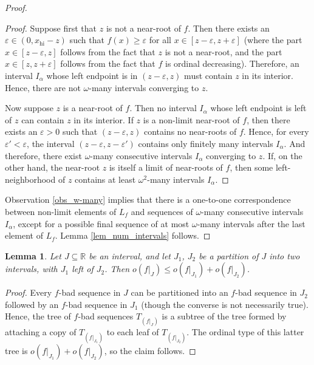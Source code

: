 \documentclass{article}
\newtheorem{Lemma}[Theorem]{Lemma}
\theoremstyle{definition}
\begin{document}
\begin{proof}
\begin{proof}
Suppose first that $z$ is not a near-root of $f$. Then there exists an $\varepsilon\in(0,x_{\mathrm{hi}}-z)$ such that $f(x)\ge\varepsilon$ for all $x\in [z-\varepsilon,z+\varepsilon]$ (where the part $x\in[z-\varepsilon, z]$ follows from the fact that $z$ is not a near-root, and the part $x\in[z, z+\varepsilon]$ follows from the fact that $f$ is ordinal decreasing). Therefore, an interval $I_\alpha$ whose left endpoint is in $(z-\varepsilon,z)$ must contain $z$ in its interior. Hence, there are not $\omega$-many intervals converging to $z$.

Now suppose $z$ is a near-root of $f$. Then no interval $I_\alpha$ whose left endpoint is left of $z$ can contain $z$ in its interior. If $z$ is a non-limit near-root of $f$, then there exists an $\varepsilon>0$ such that $(z-\varepsilon,z)$ contains no near-roots of $f$. Hence, for every $\varepsilon'<\varepsilon$, the interval $(z-\varepsilon,z-\varepsilon')$ contains only finitely many intervals $I_\alpha$. And therefore, there exist $\omega$-many consecutive intervals $I_\alpha$ converging to $z$. If, on the other hand, the near-root $z$ is itself a limit of near-roots of $f$, then some left-neighborhood of $z$ contains at least $\omega^2$-many intervals $I_\alpha$.
\end{proof}

Observation \ref{obs_w-many} implies that there is a one-to-one correspondence between non-limit elements of $L_f$ and sequences of $\omega$-many consecutive intervals $I_\alpha$, except for a possible final sequence of at most $\omega$-many intervals after the last element of $L_f$.
Lemma \ref{lem_num_intervals} follows.
\end{proof}

\begin{Lemma}\label{lem_J1J2}
    Let $J\subseteq\mathbb R$ be an interval, and let $J_1$, $J_2$ be a partition of $J$ into two intervals, with $J_1$ left of $J_2$. Then $o(f|_J)\le o(f|_{J_1})+o(f|_{J_2})$.
\end{Lemma}

\begin{proof}
    Every $f$-bad sequence in $J$ can be partitioned into an $f$-bad sequence in $J_2$ followed by an $f$-bad sequence in $J_1$ (though the converse is not necessarily true). Hence, the tree of $f$-bad sequences $T_{(f|_J)}$ is a subtree of the tree formed by attaching a copy of $T_{(f|_{J_1})}$ to each leaf of $T_{(f|_{J_2})}$. The ordinal type of this latter tree is $o(f|_{J_1})+o(f|_{J_2})$, so the claim follows.
\end{proof}
\end{document}
